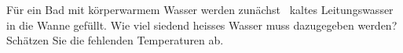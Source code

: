 Für ein Bad mit körperwarmem Wasser werden zunächst \VkO\ kaltes Leitungswasser in die Wanne gefüllt. Wie viel siedend heisses Wasser muss dazugegeben werden? Schätzen Sie die fehlenden Temperaturen ab.
